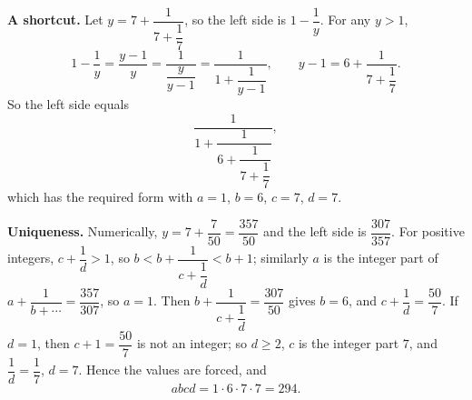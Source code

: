\textbf{A shortcut.} Let $y=7+\dfrac{1}{7+\dfrac{1}{7}}$, so the left side is $1-\dfrac{1}{y}$. For any $y>1$,
\[1-\dfrac{1}{y}=\dfrac{y-1}{y}=\dfrac{1}{\dfrac{y}{y-1}}=\dfrac{1}{1+\dfrac{1}{y-1}},\qquad y-1=6+\dfrac{1}{7+\dfrac{1}{7}}.\]
So the left side equals
\[\dfrac{1}{1+\dfrac{1}{6+\dfrac{1}{7+\dfrac{1}{7}}}},\]
which has the required form with $a=1$, $b=6$, $c=7$, $d=7$.

\textbf{Uniqueness.} Numerically, $y=7+\dfrac{7}{50}=\dfrac{357}{50}$ and the left side is $\dfrac{307}{357}$. For positive integers, $c+\dfrac{1}{d}>1$, so $b<b+\dfrac{1}{c+\dfrac{1}{d}}<b+1$; similarly $a$ is the integer part of $a+\dfrac{1}{b+\cdots}=\dfrac{357}{307}$, so $a=1$. Then $b+\dfrac{1}{c+\dfrac{1}{d}}=\dfrac{307}{50}$ gives $b=6$, and $c+\dfrac{1}{d}=\dfrac{50}{7}$. If $d=1$, then $c+1=\dfrac{50}{7}$ is not an integer; so $d\ge2$, $c$ is the integer part $7$, and $\dfrac{1}{d}=\dfrac{1}{7}$, $d=7$. Hence the values are forced, and
\[abcd=1\cdot6\cdot7\cdot7=\boxed{294}.\]
